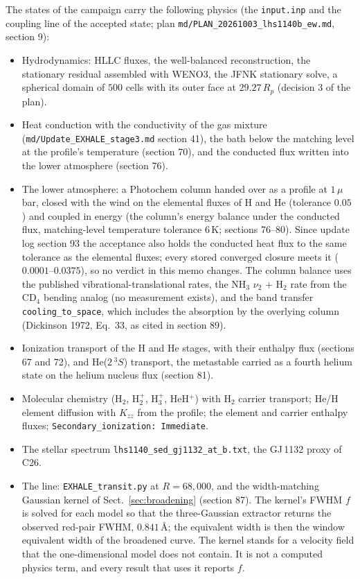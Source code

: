 \documentclass[english,a4paper]{my_memo}
\begin{document}
The states of the campaign carry the following physics (the
\texttt{input.inp} and the coupling line of the accepted state; plan
\texttt{md/PLAN\_20261003\_lhs1140b\_ew.md}, section 9):
\begin{itemize}\itemsep0.2ex
\item Hydrodynamics: HLLC fluxes, the well-balanced reconstruction, the
      stationary residual assembled with WENO3, the JFNK stationary solve,
      a spherical domain of $500$ cells with its outer face at
      $29.27\,R_p$ (decision 3 of the plan).
\item Heat conduction with the conductivity of the gas mixture
      (\texttt{md/Update\_EXHALE\_stage3.md} section 41), the bath below the
      matching level at the profile's temperature (section 70), and the
      conducted flux written into the lower atmosphere (section 76).
\item The lower atmosphere: a Photochem column handed over as a profile at
      $1\,\mu$bar, closed with the wind on the elemental fluxes of H and He
      (tolerance $0.05$) and coupled in energy (the column's energy balance
      under the conducted flux, matching-level temperature tolerance
      $6$\,K; sections 76--80). Since update log section 93 the
      acceptance also holds the conducted heat flux to the same tolerance
      as the elemental fluxes; every stored converged closure meets it
      ($0.0001$--$0.0375$), so no verdict in this memo changes. The column balance uses the published
      vibrational-translational rates, the NH$_3$ $\nu_2$ + H$_2$ rate from
      the CD$_4$ bending analog (no measurement exists), and the band
      transfer \texttt{cooling\_to\_space}, which includes the absorption
      by the overlying column (Dickinson 1972, Eq.~33, as cited in
      section 89).
\item Ionization transport of the H and He stages, with their enthalpy
      flux (sections 67 and 72), and He($2\,^3S$) transport, the metastable
      carried as a fourth helium state on the helium nucleus flux
      (section 81).
\item Molecular chemistry (H$_2$, H$_2^+$, H$_3^+$, HeH$^+$) with H$_2$
      carrier transport; He/H element diffusion with $K_{zz}$ from the
      profile; the element and carrier enthalpy fluxes;
      \texttt{Secondary\_ionization: Immediate}.
\item The stellar spectrum \texttt{lhs1140\_sed\_gj1132\_at\_b.txt}, the
      GJ\,1132 proxy of C26.
\item The line: \texttt{EXHALE\_transit.py} at $R = 68{,}000$, and the
      width-matching Gaussian kernel of Sect.~\ref{sec:broadening}
      (section 87). The kernel's FWHM $f$ is solved for each model so that
      the three-Gaussian extractor returns the observed red-pair FWHM,
      $0.841$\,\AA; the equivalent width is then the window equivalent width
      of the broadened curve. The kernel stands for a velocity field that
      the one-dimensional model does not contain. It is not a computed
      physics term, and every result that uses it reports $f$.
\end{itemize}
\end{document}
